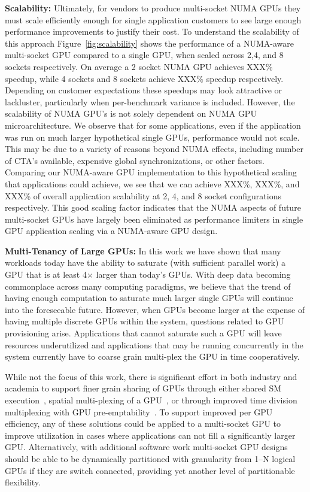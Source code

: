 \textbf{Scalability:} Ultimately, for vendors to produce multi-socket NUMA GPUs
they must scale efficiently enough for single application customers to see
large enough performance improvements to justify their cost.  To understand
the scalability of this approach Figure~\ref{fig:scalability} shows the
performance of a NUMA-aware multi-socket GPU compared to a single GPU, when
scaled across 2,4, and 8 sockets respectively.  On average a 2 socket NUMA
GPU achieves XXX\% speedup, while 4 sockets and 8 sockets achieve XXX\% speedup
respectively.  Depending on customer expectations these speedups may look attractive
or lackluster, particularly when per-benchmark variance is included.  However,
the scalability of NUMA GPU's is not solely dependent on NUMA GPU microarchitecture.
We observe that for some applications, even if the application was run on much
larger hypothetical single GPUs, performance would not scale.  This may be due to
a variety of reasons beyond NUMA effects, including number of CTA's available, expensive
global synchronizations, or other factors.  Comparing our NUMA-aware GPU implementation
to this hypothetical scaling that applications could achieve, we see that we can
achieve XXX\%, XXX\%, and XXX\% of overall application scalability at 2, 4, and 8 socket
configurations respectively.  This good scaling factor indicates that the NUMA
aspects of future multi-socket GPUs have largely been eliminated as performance limiters
in single GPU application scaling via a NUMA-aware GPU design.

\textbf{Multi-Tenancy of Large GPUs:} In this work we have shown that many 
workloads today have the ability to
saturate (with sufficient parallel work) a GPU that is at least 4$\times$
larger than today's GPUs.  With deep data becoming commonplace across many
computing paradigms, we believe that the trend of having enough computation
to saturate much larger single GPUs will continue into the foreseeable future.
However, when GPUs become larger at the expense of having multiple discrete
GPUs within the system, questions related to GPU provisioning arise.  Applications
that cannot saturate such a GPU will leave resources underutilized and applications
that may be running concurrently in the system currently have to coarse grain
multi-plex the GPU in time cooperatively.  

While not the focus of this work,
there is significant effort in both industry and academia to support finer
grain sharing of GPUs through either shared SM execution~\cite{XXX}, spatial
multi-plexing of a GPU~\cite{XXX}, or through improved time division multiplexing
with GPU pre-emptability~\cite{XXX}.  To support improved per GPU efficiency,
any of these solutions could be applied to a multi-socket GPU to improve utilization
in cases where applications can not fill a significantly larger GPU.  Alternatively,
with additional software work multi-socket GPU designs should be able to be dynamically
partitioned with granularity from 1--N logical GPUs if they are switch connected, providing
yet another level of partitionable flexibility.

